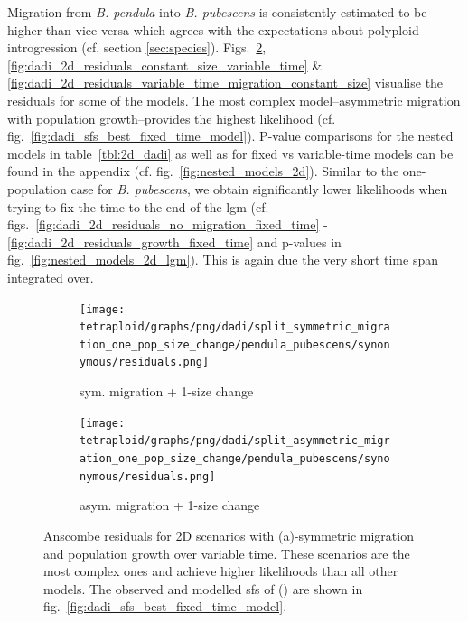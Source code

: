 \documentclass[hidelinks,11pt]{article}
\newcommand{\pendula}{\textit{B. pendula}}
\newcommand{\pubescens}{\textit{B. pubescens}}
\begin{document}
\begin{table}[H]
        \label{tbl:2d_dadi}
    \end{table}

    Migration from \pendula{} into \pubescens{} is consistently estimated to be higher than vice versa which agrees with the expectations about polyploid introgression (cf. section \ref{sec:species}). Figs.~\ref{fig:dadi_2d_residuals_growth_variable_time}, \ref{fig:dadi_2d_residuals_constant_size_variable_time} \& \ref{fig:dadi_2d_residuals_variable_time_migration_constant_size} visualise the residuals for some of the models. The most complex model--asymmetric migration with population growth--provides the highest likelihood (cf. fig.~\ref{fig:dadi_sfs_best_fixed_time_model}). P-value comparisons for the nested models in table~\ref{tbl:2d_dadi} as well as for fixed vs variable-time models can be found in the appendix (cf. fig.~\ref{fig:nested_models_2d}). Similar to the one-population case for \pubescens{}, we obtain significantly lower likelihoods when trying to fix the time to the end of the \acrshort{lgm} (cf. figs.~\ref{fig:dadi_2d_residuals_no_migration_fixed_time} - \ref{fig:dadi_2d_residuals_growth_fixed_time} and p-values in fig.~\ref{fig:nested_models_2d_lgm}). This is again due the very short time span integrated over.

    \begin{figure}[H]
        \centering
        \begin{subfigure}[b]{0.48\textwidth}
            \texttt{[image: tetraploid/graphs/png/dadi/split\_symmetric\_migration\_one\_pop\_size\_change/pendula\_pubescens/synonymous/residuals.png]}
            \caption{sym. migration + 1-size change}
        \end{subfigure}
        \hfill
        \begin{subfigure}[b]{0.503\textwidth}
            \texttt{[image: tetraploid/graphs/png/dadi/split\_asymmetric\_migration\_one\_pop\_size\_change/pendula\_pubescens/synonymous/residuals.png]}
            \caption{asym. migration + 1-size change\label{fig:dadi_2d_residuals_asymmetric_growth_variable_time}}
        \end{subfigure}
        \caption{Anscombe residuals for 2D scenarios with \mbox{(a)-symmetric} migration and population growth over variable time. These scenarios are the most complex ones and achieve higher likelihoods than all other models. The observed and modelled \acrshort{sfs} of () are shown in fig.~\ref{fig:dadi_sfs_best_fixed_time_model}.}
        \label{fig:dadi_2d_residuals_growth_variable_time}
    \end{figure}
\end{document}
